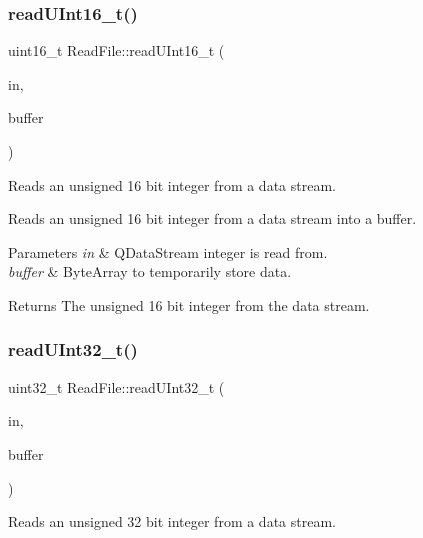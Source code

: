 \subsubsection{\texorpdfstring{read\+U\+Int16\+\_\+t()}{readUInt16\_t()}}
{\footnotesize\ttfamily uint16\+\_\+t Read\+File\+::read\+U\+Int16\+\_\+t (\begin{DoxyParamCaption}\item[{Q\+Data\+Stream $\ast$}]{in,  }\item[{Q\+Byte\+Array $\ast$}]{buffer }\end{DoxyParamCaption})\hspace{0.3cm}{\ttfamily [static]}}



Reads an unsigned 16 bit integer from a data stream. 

Reads an unsigned 16 bit integer from a data stream into a buffer. 
\begin{DoxyParams}{Parameters}
{\em in} & Q\+Data\+Stream integer is read from. \\
\hline
{\em buffer} & Byte\+Array to temporarily store data. \\
\hline
\end{DoxyParams}
\begin{DoxyReturn}{Returns}
The unsigned 16 bit integer from the data stream. 
\end{DoxyReturn}
\mbox{\label{class_read_file_a8d257e619fcfde95b9a4575985302fb5}} 
\subsubsection{\texorpdfstring{read\+U\+Int32\+\_\+t()}{readUInt32\_t()}}
{\footnotesize\ttfamily uint32\+\_\+t Read\+File\+::read\+U\+Int32\+\_\+t (\begin{DoxyParamCaption}\item[{Q\+Data\+Stream $\ast$}]{in,  }\item[{Q\+Byte\+Array $\ast$}]{buffer }\end{DoxyParamCaption})\hspace{0.3cm}{\ttfamily [static]}}



Reads an unsigned 32 bit integer from a data stream. 

